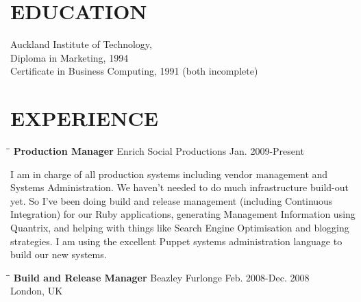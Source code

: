 \documentclass{res}
\begin{document}
 

                      
                                  
\begin{resume}

\section{EDUCATION}          
    Auckland Institute of Technology,  \\        
    Diploma in Marketing, 1994   \\       
    Certificate in Business Computing, 1991 (both incomplete) %

 
\section{EXPERIENCE}
   \vspace{-0.1in}  
   \begin{tabbing}
   \hspace{2.3in}\= \hspace{2.6in}\= \kill %
    {\bf Production Manager} \>Enrich Social Productions     \>Jan. 2009-Present

   \end{tabbing}\vspace{-20pt}      %
    I am in charge of all production systems including vendor management and Systems Administration.  We haven't needed to do much infrastructure build-out yet.    So I've been doing build and release management (including Continuous Integration) for our Ruby applications, generating Management Information using Quantrix, and helping with things like Search Engine Optimisation and blogging strategies. I am using the excellent Puppet systems administration language to build our new systems. 
   \begin{tabbing}
   \hspace{2.3in}\= \hspace{2.6in}\= \kill %
     {\bf Build and Release Manager} \>Beazley Furlonge     \>Feb. 2008-Dec. 2008\\ 
                          \>London, UK
   \end{tabbing}\vspace{-20pt}


\end{resume}
\end{document}
